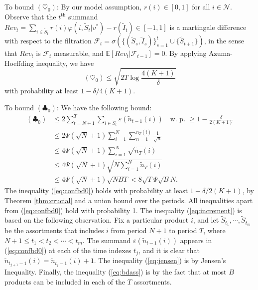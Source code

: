 \documentclass{article}
\theoremstyle{definition}
\newcommand{\EEE}{\mathbb{E}}
\newcommand{\FFF}{\mathcal{F}}
\newcommand{\NNN}{\mathcal{N}}
\begin{document}
To bound $(\heartsuit_0)$: By our model assumption, $r(i)\in [0, 1]$ for all $i\in \NNN$. Observe that the $t^\text{th}$ summand $Rev_t =  \sum_{i\in \tilde{S}_t} r(i) \varphi(i, \tilde{S}_t|v^*) - r(\tilde{I}_t)\in[-1, 1]$ is a martingale difference with respect to the filtration $\FFF_t = \sigma(\{(\tilde{S}_s, \tilde{I}_s)\}^t_{s = 1}\cup \{\tilde{S}_{t+1}\})$, in the sense that $Rev_t$ is $\FFF_t$ measurable, and $\EEE[Rev_t | \FFF_{t-1}] = 0$. By applying Azuma-Hoeffding inequality, we have
\begin{equation}
(\heartsuit_0) \leq \sqrt{2T\log{\frac{4(K+1)}{\delta}}}
\end{equation}
with probability at least $1 - \delta/4(K+1)$.

To bound $(\clubsuit_0)$: We have the following bound: 
\begin{align}
(\clubsuit_0) &\leq 2\sum^T_{t = N+1}\sum_{i\in \tilde{S}_t}\varepsilon(\tilde{n}_{t - 1}(i))\quad \text{w. p. $\geq 1 - \frac{\delta}{2(K+1)}$}\label{eq:confbd0}\\
&\leq 2\Psi(\sqrt{N} + 1) \sum^{N}_{i = 1}\sum^{\tilde{n}_T(i)}_{n = 1}\frac{1}{\sqrt{n}}\label{eq:increment}\\
&\leq 4\Psi(\sqrt{N} + 1) \sum^{N}_{i = 1}\sqrt{\tilde{n}_T(i)}\nonumber\\
&\leq 4\Psi(\sqrt{N} + 1) \sqrt{N \sum^{N}_{i = 1}\tilde{n}_T(i)}\label{eq:jensen} \\
&\leq 4\Psi(\sqrt{N} + 1) \sqrt{N BT} < 8\sqrt{T} \Psi \sqrt{B} N .\label{eq:bdass}
\end{align}
The inequality (\ref{eq:confbd0}) holds with probability at least $1- \delta/2(K+1)$, by Theorem \ref{thm:crucial} and a union bound over the periods. All inequalities apart from (\ref{eq:confbd0}) hold with probability 1. The inequality (\ref{eq:increment}) is based on the following observation. Fix a particular product $i$, and let $\tilde{S}_{t_1}, \cdots, \tilde{S}_{t_m}$ be the assortments that includes $i$ from period $N+1$ to period $T$, where $N+1 \leq t_1< t_2 < \cdots < t_m$. The summand $\varepsilon(\tilde{n}_{t-1}(i))$ appears in (\ref{eq:confbd0}) at each of the time indexes $t_j$, and it is clear that $\tilde{n}_{t_{j+1} - 1}(i) = \tilde{n}_{t_j - 1}(i) + 1$. The inequality (\ref{eq:jensen}) is by Jensen's Inequality. Finally, the inequality (\ref{eq:bdass}) is by the fact that at most $B$ products can be included in each of the $T$ assortments.
 
\end{document}

